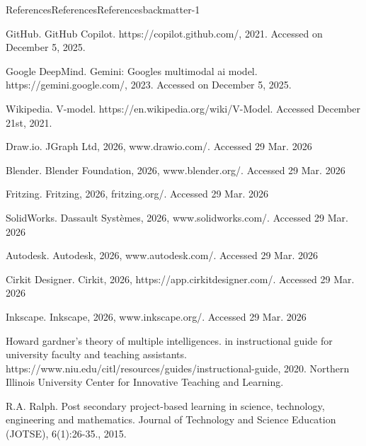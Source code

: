 \documentclass[oneside,10pt,]{book}
\numberwithin{equation}{section}
\begin{document}
%
\begin{references-chapter-numberless}{References}{References}{}{References}{}{}{backmatter-1}
\begin{referencelist}
\hypertarget{copilot}{}GitHub. GitHub Copilot. https:\slash{}\slash{}copilot.github.com\slash{}, 2021. Accessed on December 5, 2025.%

\hypertarget{gemini}{}Google DeepMind. Gemini: Googles multimodal ai model. https:\slash{}\slash{}gemini.google.com\slash{}, 2023. Accessed on December 5, 2025.%

\hypertarget{vandv}{}Wikipedia. V-model. https:\slash{}\slash{}en.wikipedia.org\slash{}wiki\slash{}V-Model. Accessed December 21st, 2021.%

\hypertarget{drawio}{}Draw.io. JGraph Ltd, 2026, www.drawio.com\slash{}. Accessed 29 Mar. 2026%

\hypertarget{blender}{}Blender. Blender Foundation, 2026, www.blender.org\slash{}. Accessed 29 Mar. 2026%

\hypertarget{fritzing}{}Fritzing. Fritzing, 2026, fritzing.org\slash{}. Accessed 29 Mar. 2026%

\hypertarget{solidworks}{}SolidWorks. Dassault Systèmes, 2026, www.solidworks.com\slash{}. Accessed 29 Mar. 2026%

\hypertarget{autodesk}{}Autodesk. Autodesk, 2026, www.autodesk.com\slash{}. Accessed 29 Mar. 2026%

\hypertarget{cirkit}{}Cirkit Designer. Cirkit, 2026, https:\slash{}\slash{}app.cirkitdesigner.com\slash{}. Accessed 29 Mar. 2026%

\hypertarget{inkscape}{}Inkscape. Inkscape, 2026, www.inkscape.org\slash{}. Accessed 29 Mar. 2026%

\hypertarget{Gardner}{}Howard gardner’s theory of multiple intelligences. in instructional guide for university faculty and teaching assistants. https:\slash{}\slash{}www.niu.edu\slash{}citl\slash{}resources\slash{}guides\slash{}instructional-guide, 2020. Northern Illinois University Center for Innovative Teaching and Learning.%

\hypertarget{Ralph}{}R.A. Ralph. Post secondary project-based learning in science, technology, engineering and mathematics. Journal of Technology and Science Education (JOTSE), 6(1):26-35., 2015.%


\end{referencelist}
\end{references-chapter-numberless}
\end{document}
